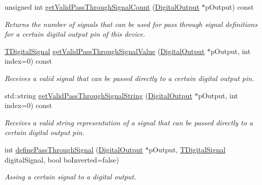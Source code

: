 \begin{DoxyCompactItemize}
unsigned int \hyperlink{classmv_i_m_p_a_c_t_1_1acquire_1_1_output_signal_generator_frame_grabber_a80eb29acf966b1cf37a72e570bfaf77a}{get\+Valid\+Pass\+Through\+Signal\+Count} (\hyperlink{classmv_i_m_p_a_c_t_1_1acquire_1_1_digital_output}{Digital\+Output} $\ast$p\+Output) const 
\begin{DoxyCompactList}\small\item\em Returns the number of signals that can be used for pass through signal definitions for a certain digital output pin of this device. \end{DoxyCompactList}\item 
\hyperlink{group___device_specific_interface_ga29840a466892bced617a5f3a6edb5218}{T\+Digital\+Signal} \hyperlink{classmv_i_m_p_a_c_t_1_1acquire_1_1_output_signal_generator_frame_grabber_a79f2053c88997435f48804ed0ec3598c}{get\+Valid\+Pass\+Through\+Signal\+Value} (\hyperlink{classmv_i_m_p_a_c_t_1_1acquire_1_1_digital_output}{Digital\+Output} $\ast$p\+Output, int index=0) const 
\begin{DoxyCompactList}\small\item\em Receives a valid signal that can be passed directly to a certain digital output pin. \end{DoxyCompactList}\item 
std\+::string \hyperlink{classmv_i_m_p_a_c_t_1_1acquire_1_1_output_signal_generator_frame_grabber_a9cebc24507b191a912c916a6b1d3b845}{get\+Valid\+Pass\+Through\+Signal\+String} (\hyperlink{classmv_i_m_p_a_c_t_1_1acquire_1_1_digital_output}{Digital\+Output} $\ast$p\+Output, int index=0) const 
\begin{DoxyCompactList}\small\item\em Receives a valid string representation of a signal that can be passed directly to a certain digital output pin. \end{DoxyCompactList}\item 
int \hyperlink{classmv_i_m_p_a_c_t_1_1acquire_1_1_output_signal_generator_frame_grabber_a210e143a9bcd614d5bed0b104594f709}{define\+Pass\+Through\+Signal} (\hyperlink{classmv_i_m_p_a_c_t_1_1acquire_1_1_digital_output}{Digital\+Output} $\ast$p\+Output, \hyperlink{group___device_specific_interface_ga29840a466892bced617a5f3a6edb5218}{T\+Digital\+Signal} digital\+Signal, bool bo\+Inverted=false)
\begin{DoxyCompactList}\small\item\em Assing a certain signal to a digital output. \end{DoxyCompactList}\item 

\end{DoxyCompactItemize}
